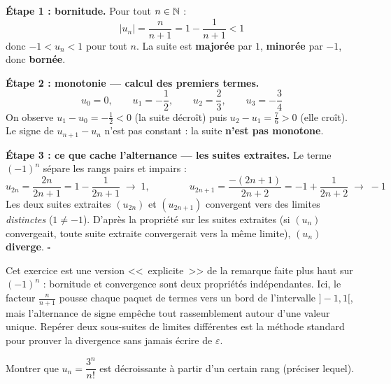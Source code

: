 \begin{proofbox}[Solution]
\textbf{Étape 1 : bornitude.} Pour tout $n \in \mathbb{N}$ :
\[
  |u_n| = \frac{n}{n+1} = 1 - \frac{1}{n+1} < 1
\]
donc $-1 < u_n < 1$ pour tout $n$. La suite est \textbf{majorée} par $1$, \textbf{minorée} par $-1$, donc \textbf{bornée}.

\textbf{Étape 2 : monotonie --- calcul des premiers termes.}
\[
  u_0 = 0, \qquad u_1 = -\frac{1}{2}, \qquad u_2 = \frac{2}{3}, \qquad u_3 = -\frac{3}{4}
\]
On observe $u_1 - u_0 = -\frac{1}{2} < 0$ (la suite décroît) puis $u_2 - u_1 = \frac{7}{6} > 0$ (elle croît). Le signe de $u_{n+1} - u_n$ n'est pas constant : la suite \textbf{n'est pas monotone}.

\textbf{Étape 3 : ce que cache l'alternance --- les suites extraites.} Le terme $(-1)^n$ sépare les rangs pairs et impairs :
\[
  u_{2n} = \frac{2n}{2n+1} = 1 - \frac{1}{2n+1} \;\longrightarrow\; 1, \qquad\qquad u_{2n+1} = \frac{-(2n+1)}{2n+2} = -1 + \frac{1}{2n+2} \;\longrightarrow\; -1
\]
Les deux suites extraites $(u_{2n})$ et $(u_{2n+1})$ convergent vers des limites \emph{distinctes} ($1 \neq -1$). D'après la propriété sur les suites extraites (si $(u_n)$ convergeait, toute suite extraite convergerait vers la même limite), $(u_n)$ \textbf{diverge}. \hfill$\square$
\end{proofbox}

\begin{intuitionbox}
Cet exercice est une version <<~explicite~>> de la remarque faite plus haut sur $(-1)^n$ : bornitude et convergence sont deux propriétés indépendantes. Ici, le facteur $\frac{n}{n+1}$ pousse chaque paquet de termes vers un bord de l'intervalle $]-1,1[$, mais l'alternance de signe empêche tout rassemblement autour d'une valeur unique. Repérer deux sous-suites de limites différentes est la méthode standard pour prouver la divergence sans jamais écrire de $\varepsilon$.
\end{intuitionbox}


\begin{exbox}
Montrer que $u_n = \dfrac{3^n}{n!}$ est décroissante à partir d'un certain rang (préciser lequel).
\end{exbox}

